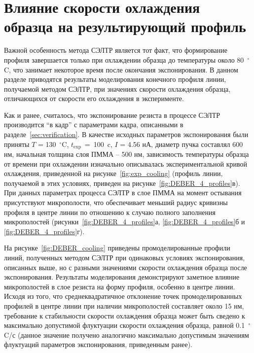 \section{Влияние скорости охлаждения образца на результирующий профиль}

Важной особенность метода СЭЛТР является тот факт, что формирование профиля завершается только при охлаждении образца до температуры около 80~$^\circ$C, что занимает некоторое время после окончания экспонирования.
В данном разделе приводятся результаты моделирования конечного профиля линии, получаемой методом СЭЛТР, при значениях скорости охлаждения образца, отличающихся от скорости его охлаждения в эксперименте.

Как и ранее, считалось, что экспонирование резиста в процессе СЭЛТР производится ``в кадр'' с параметрами кадра, описанными в разделе~\ref{sec:verification}.
В качестве исходных параметров экспонирования были приняты $T$ = 130~$^\circ$C, $t_\mathrm{exp}$~=~100~c, $I$ = 4.56 нА, диаметр пучка составлял 600 нм, начальная толщина слоя ПММА -- 500 нм, зависимость температуры образца от времени при охлаждении изначально описывалась экспериментальной кривой охлаждения, приведенной на рисунке~\ref{fig:exp_cooling} (профиль линии, получаемой в этих условиях, приведен на рисунке~\ref{fig:DEBER_4_profiles}в).
При данных параметрах процесса СЭЛТР в слое ПММА на момент остывания присутствуют микрополости, что обеспечивает меньший радиус кривизны профиля в центре линии по отношению к случаю полного заполнения микрополостей (рисунки~\ref{fig:DEBER_4_profiles}а, \ref{fig:DEBER_4_profiles}б и \ref{fig:DEBER_4_profiles}г).

На рисунке~\ref{fig:DEBER_cooling} приведены промоделированные профили линий, полученных методом СЭЛТР при одинаковых условиях экспонирования, описанных выше, но с разными значениями скорости охлаждения образца после экспонирования.
Результаты моделирования демонстрируют заметное влияние микрополостей в слое резиста на форму профиля, особенно в центре линии.
Исходя из того, что среднеквадратичное отклонение точек промоделированных профилей в центре линии при наличии микрополостей составляет около 15 нм, требование к стабильности скорости охлаждения образца может быть сведено к максимально допустимой флуктуации скорости охлаждения образца, равной 0.1~$^\circ$C/с (данное значение получено аналогично максимально допустимым значениям флуктуаций параметров экспонирования, приведенным ранее).


